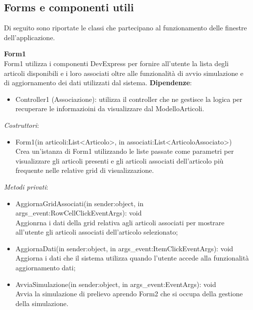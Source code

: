 \subsection{Forms e componenti utili} %
Di seguito sono riportate le classi che partecipano al funzionamento delle finestre dell'applicazione.

\textbf{Form1}\\
Form1 utilizza i componenti DevExpress per fornire all'utente la lista degli articoli disponibili 
e i loro associati oltre alle funzionalità di avvio simulazione e di aggiornamento dei dati utilizzati dal sistema.
\textbf{Dipendenze}:
\begin{itemize}
    \item Controller1 (Associazione): utilizza il controller che ne gestisce la logica per recuperare le informazioini da visualizzare dal ModelloArticoli.\\
\end{itemize}
\textit{Costruttori}:\\
\begin{itemize}
    \item Form1(in articoli:List<Articolo>, in associati:List<ArticoloAssociato>)\\
    Crea un'istanza di Form1 utilizzando le liste passate come parametri per visualizzare gli articoli presenti e 
    gli articoli associati dell'articolo più frequente nelle relative grid di visualizzazione.
\end{itemize}
\textit{Metodi privati}:\\
\begin{itemize}
    \item AggiornaGridAssociati(in sender:object, in args\_event:RowCellClickEventArgs): void\\
    Aggionrna i dati della grid relativa agli articoli associati per mostrare all'utente 
    gli articoli associati dell'articolo selezionato;
    \item AggiornaDati(in sender:object, in args\_event:ItemClickEventArgs): void \\
    Aggiorna i dati che il sistema utilizza quando l'utente accede alla funzionalità aggiornamento dati;
    \item AvviaSimulazione(in sender:object, in args\_event:EventArgs): void \\
    Avvia la simulazione di prelievo aprendo Form2 che si occupa della gestione della simulazione. 
\end{itemize} 

